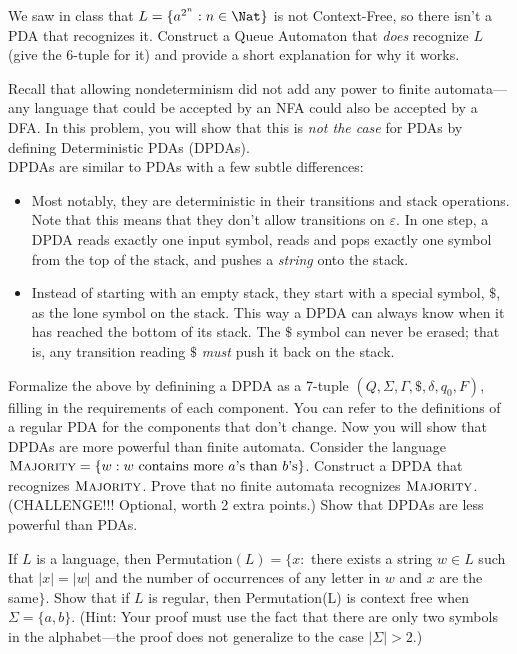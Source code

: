 \documentclass[solution, letterpaper]{cscie121}
\begin{document}
We saw in class that $L=\{a^{2^n} : n \in \Nat \}$ is not Context-Free, so
there isn't a PDA that recognizes it. Construct a Queue Automaton that {\em
does} recognize $L$ (give the 6-tuple for it) and provide a short explanation
for why it works.

\begin{solution}
\end{solution}


Recall that allowing nondeterminism did not add any power to finite 
automata---any language that could be accepted by an NFA could also be 
accepted by a DFA. In this problem, you will show that this is \emph{not 
the case} for PDAs by defining Deterministic PDAs (DPDAs). \\ 

DPDAs are similar to PDAs with a few subtle differences: 
\begin{itemize}
\item Most notably, they are deterministic in their transitions and
  stack operations.  Note that this means that they don't allow
  transitions on $\varepsilon$.  In one step, a DPDA reads exactly one
  input symbol, reads and pops exactly one symbol from the top of the
  stack, and pushes a {\em string} onto the stack.
\item Instead of starting with an empty stack, they start with a
  special symbol, $\$$, as the lone symbol on the stack. This way a
  DPDA can always know when it has reached the bottom of its
  stack. The $\$$ symbol can never be erased; that is, any transition
  reading $\$$ \emph{must} push it back on the stack.
\end{itemize}

\subproblem  Formalize the above by definining a DPDA as a 7-tuple $(Q,
\Sigma, \Gamma, \$, \delta, q_0, F)$, filling in the requirements of
each component.  You can refer to the definitions of a regular PDA for
the components that don't change.
\subproblem Now you will show that DPDAs are more powerful than finite automata. Consider the language $\textsc{Majority} =\{w: w \text{ contains more
$a$'s than  $b$'s}\}$. Construct a DPDA that recognizes $\textsc{Majority}$. Prove that no finite automata recognizes $\textsc{Majority}$.
\subproblem (CHALLENGE!!! Optional, worth 2 extra points.) Show that DPDAs are less powerful than PDAs.

\begin{solution}
\end{solution}

If $L$ is a language, then {\sc Permutation}$(L) = \{ x:
$ there exists a string $w \in L$ such that $|x|=|w|$ and the number
of occurrences of any letter in $w$ and $x$ are the same$\}$. Show
that if $L$ is regular, then {\sc Permutation}(L) is context free
when $\Sigma = \{a, b\}$. (Hint: Your proof must use the fact that there are only two symbols in the alphabet---the proof does not generalize to the case $\lvert \Sigma\rvert >2$.)

\begin{solution}
\end{solution}
\end{document}
